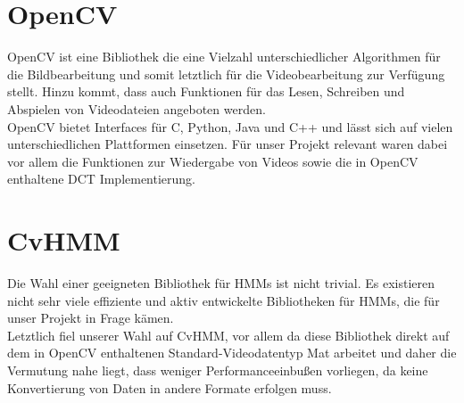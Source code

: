 \section{OpenCV}
OpenCV ist eine Bibliothek die eine Vielzahl unterschiedlicher Algorithmen für die Bildbearbeitung und somit letztlich für die Videobearbeitung zur Verfügung stellt.
 Hinzu kommt, dass auch Funktionen für das Lesen, Schreiben und Abspielen von Videodateien angeboten werden.\\

OpenCV bietet Interfaces für C, Python, Java und C++ und lässt sich auf vielen unterschiedlichen Plattformen einsetzen.
 Für unser Projekt relevant waren dabei vor allem die Funktionen zur Wiedergabe von Videos sowie die in OpenCV enthaltene DCT Implementierung.


\section{CvHMM}
Die Wahl einer geeigneten Bibliothek für HMMs ist nicht trivial.
 Es existieren nicht sehr viele effiziente und aktiv entwickelte Bibliotheken für HMMs, die für unser Projekt in Frage kämen.\\

Letztlich fiel unserer Wahl auf CvHMM, vor allem da diese Bibliothek direkt auf dem in OpenCV enthaltenen Standard-Videodatentyp Mat arbeitet und daher die Vermutung nahe liegt, dass weniger Performanceeinbußen vorliegen, da keine Konvertierung von Daten in andere Formate erfolgen muss.\\


